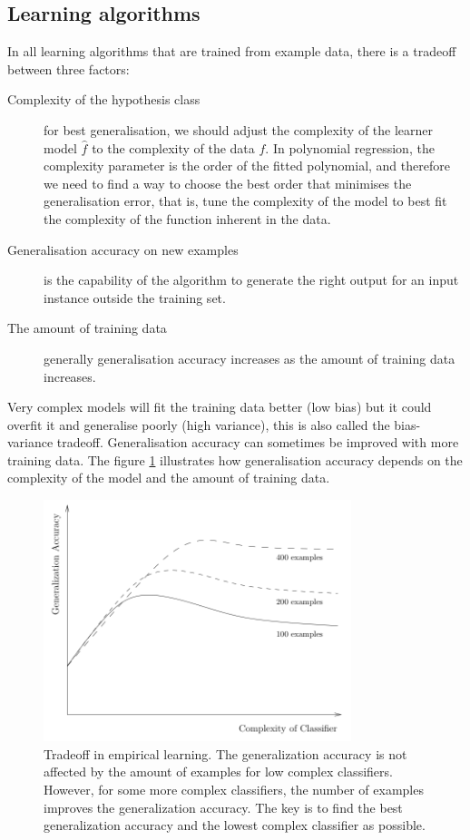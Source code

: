\subsection{Learning algorithms}
In all learning algorithms that are trained from example data, there is a tradeoff \cite{dietterich2003} between three factors:
\begin{description}
\item[Complexity of the hypothesis class] for best generalisation, we should adjust the complexity of the learner model $\hat{f}$ to the complexity of the data $f$. In polynomial regression, the complexity parameter is the order of the fitted polynomial, and therefore we need to find a way to choose the best order that minimises the generalisation error, that is, tune the complexity of the model to best fit the complexity of the function inherent in the data.
\item[Generalisation accuracy on new examples] is the capability of the algorithm to generate the right output for an input instance outside the training set.
\item[The amount of training data]  generally generalisation accuracy increases as the amount of training data increases.
\end{description}

Very complex models will fit the training data better (low bias) but it could overfit it and generalise poorly (high variance), this is also called the bias-variance tradeoff.  Generalisation accuracy can sometimes be improved with more training data. The figure \ref{fig:tradeoff} illustrates how generalisation accuracy depends on the complexity of the model and the amount of training data.

\begin{figure}[!h]
  \centering
  \includegraphics[width=0.8\textwidth]{img/3tradeoff}
  \caption{Tradeoff in empirical learning. The generalization accuracy is not affected by the amount of examples for low complex classifiers. However, for some more complex classifiers, the number of examples improves the generalization accuracy. The key is to find the best generalization accuracy and the lowest complex classifier as possible. }
  \label{fig:tradeoff}
\end{figure}

